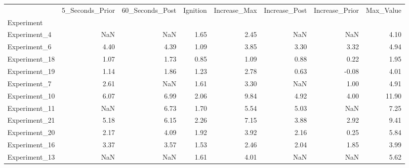 \begin{tabular}{lrrrrrrr}
\toprule
{} &  5\_Seconds\_Prior &  60\_Seconds\_Post &  Ignition &  Increase\_Max &  Increase\_Post &  Increase\_Prior &  Max\_Value \\
Experiment    &                  &                  &           &               &                &                 &            \\
\midrule
Experiment\_4  &              NaN &              NaN &      1.65 &          2.45 &            NaN &             NaN &       4.10 \\
Experiment\_6  &             4.40 &             4.39 &      1.09 &          3.85 &           3.30 &            3.32 &       4.94 \\
Experiment\_18 &             1.07 &             1.73 &      0.85 &          1.09 &           0.88 &            0.22 &       1.95 \\
Experiment\_19 &             1.14 &             1.86 &      1.23 &          2.78 &           0.63 &           -0.08 &       4.01 \\
Experiment\_7  &             2.61 &              NaN &      1.61 &          3.30 &            NaN &            1.00 &       4.91 \\
Experiment\_10 &             6.07 &             6.99 &      2.06 &          9.84 &           4.92 &            4.00 &      11.90 \\
Experiment\_11 &              NaN &             6.73 &      1.70 &          5.54 &           5.03 &             NaN &       7.25 \\
Experiment\_21 &             5.18 &             6.15 &      2.26 &          7.15 &           3.88 &            2.92 &       9.41 \\
Experiment\_20 &             2.17 &             4.09 &      1.92 &          3.92 &           2.16 &            0.25 &       5.84 \\
Experiment\_16 &             3.37 &             3.57 &      1.53 &          2.46 &           2.04 &            1.85 &       3.99 \\
Experiment\_13 &              NaN &              NaN &      1.61 &          4.01 &            NaN &             NaN &       5.62 \\
\bottomrule
\end{tabular}
